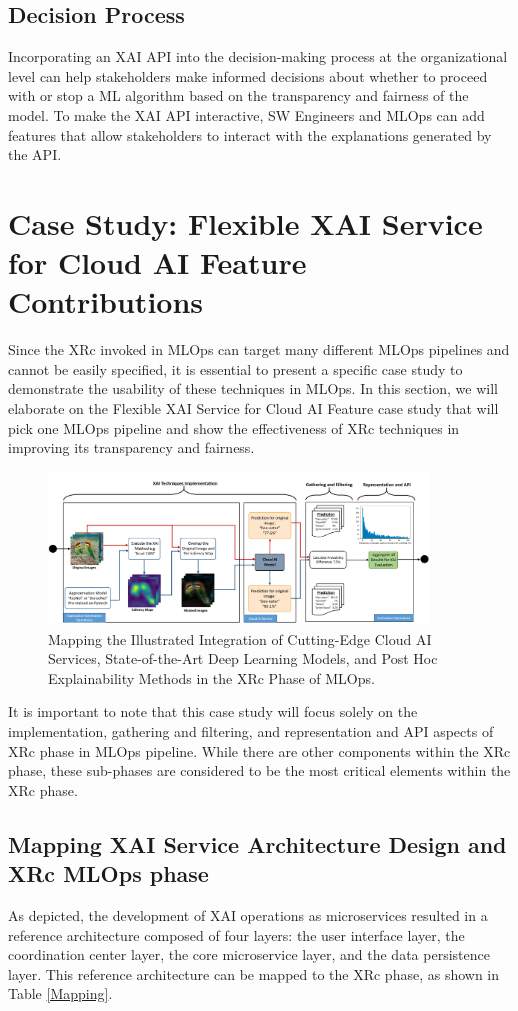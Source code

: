 \documentclass[conference]{IEEEtran}
\begin{document}
\subsection{Decision Process}
Incorporating an XAI API into the decision-making process at the organizational level can help stakeholders make informed decisions about whether to proceed with or stop a ML algorithm based on the transparency and fairness of the model. To make the XAI API interactive, SW Engineers and MLOps can add features that allow stakeholders to interact with the explanations generated by the API.
\section{Case Study: Flexible XAI Service for Cloud AI Feature Contributions}
Since the XRc invoked in MLOps can target many different MLOps pipelines and cannot be easily specified, it is essential to present a specific case study to demonstrate the usability of these techniques in MLOps. In this section, we will elaborate on the Flexible XAI Service for Cloud AI Feature case study that will pick one MLOps pipeline and show the effectiveness of XRc techniques in improving its transparency and fairness.
\begin{figure}[htbp!!]
	\centering
	\includegraphics[width=0.9\textwidth]{XAI_MT.png}
	\caption{Mapping the Illustrated Integration of Cutting-Edge Cloud AI Services, State-of-the-Art Deep Learning Models, and Post Hoc Explainability Methods in the XRc Phase of MLOps.}
	\label{MIICE}
\end{figure}

It is important to note that this case study will focus solely on the implementation, gathering and filtering, and representation and API \cite{TobyAPI} aspects of XRc phase in MLOps pipeline. While there are other components within the XRc phase, these sub-phases are considered to be the most critical elements within the XRc phase.

\subsection{Mapping XAI Service Architecture Design and XRc MLOps phase}
As depicted, the development of XAI operations as microservices resulted in a reference architecture composed of four layers: the user interface layer, the coordination center layer, the core microservice layer, and the data persistence layer. This reference architecture can be mapped to the XRc phase, as shown in Table \ref{Mapping}.
\end{document}
